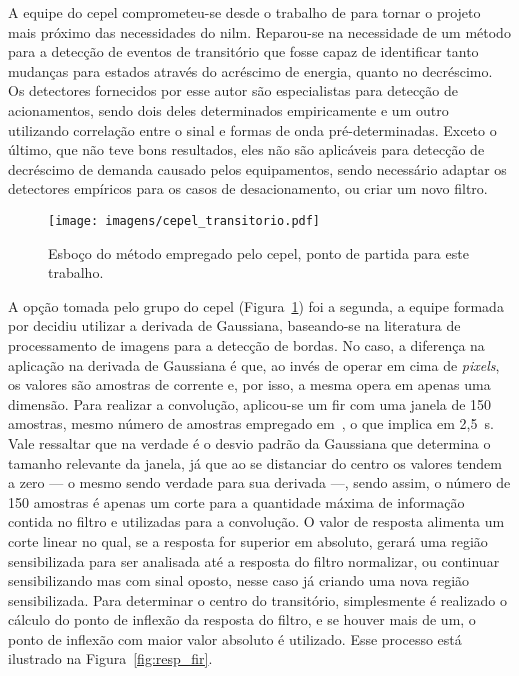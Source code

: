A equipe do \gls{cepel} comprometeu-se desde o trabalho de
\citeauthor*{nilm_cepel_alvaro} para tornar o projeto mais próximo das
necessidades do \gls{nilm}. Reparou-se na necessidade de um
método para a detecção de eventos de transitório que fosse capaz de
identificar tanto mudanças para estados através do acréscimo de
energia, quanto no decréscimo. Os detectores fornecidos por esse autor
são especialistas para detecção de acionamentos, sendo dois deles
determinados empiricamente e um outro utilizando correlação entre o
sinal e formas de onda pré-determinadas. Exceto o último, que não teve
bons resultados, eles não são aplicáveis para detecção de decréscimo
de demanda causado pelos equipamentos, sendo necessário adaptar os
detectores empíricos para os casos de desacionamento, ou criar um novo
filtro.

\begin{figure}[h!t]
\centering
\texttt{[image: imagens/cepel\_transitorio.pdf]}
\caption[Esboço do método empregado pelo CEPEL]{Esboço do
método empregado pelo \acs{cepel}, ponto de partida para este
trabalho.}
\label{fig:cepel_transitorio}
\end{figure}


A opção tomada pelo grupo do \acs{cepel} (Figura~\ref{fig:cepel_transitorio})
foi a segunda, a equipe formada por \citet*{rel_cepel_detevt} decidiu utilizar a
derivada de Gaussiana, baseando-se na literatura de processamento de imagens
para a detecção de bordas. No caso, a diferença na aplicação na derivada de
Gaussiana é que, ao invés de operar em cima de \emph{pixels}, os valores são
amostras de corrente e, por isso, a mesma opera em apenas uma dimensão. Para
realizar a convolução, aplicou-se um \acs{fir} com uma janela de 150 amostras,
mesmo número de amostras empregado em~\cite{nilm_cepel_alvaro}, o que implica em
2,5~s.  Vale ressaltar que na verdade é o desvio padrão da Gaussiana que
determina o tamanho relevante da janela, já que ao se distanciar do centro os
valores tendem a zero --- o mesmo sendo verdade para sua derivada ---, sendo
assim, o número de 150 amostras é apenas um corte para a quantidade máxima de
informação contida no filtro e utilizadas para a convolução.  O valor de
resposta alimenta um corte linear no qual, se a resposta for superior em
absoluto, gerará uma região sensibilizada para ser analisada até a resposta do
filtro normalizar, ou continuar sensibilizando mas com sinal oposto, nesse caso
já criando uma nova região sensibilizada. Para determinar o centro do
transitório, simplesmente é realizado o cálculo do ponto de inflexão da resposta
do filtro, e se houver mais de um, o ponto de inflexão com maior valor absoluto
é utilizado. Esse processo está ilustrado na Figura~\ref{fig:resp_fir}.

